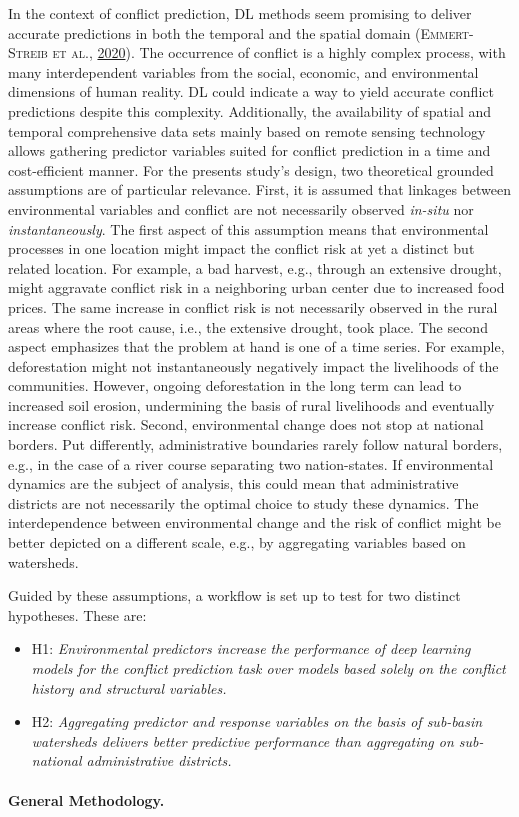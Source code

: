 \documentclass[a4paper,11pt]{article}
\begin{document}
In the context of conflict prediction, DL methods seem promising to deliver
accurate predictions in both the temporal and the spatial domain \textsc{(\textnormal{\textsc{Emmert-Streib} \textsc{et al.}}, \textnormal{\protect\hyperlink{ref-emmert2020}{2020}})}.
The occurrence of conflict is a highly complex process, with many interdependent variables
from the social, economic, and environmental dimensions of human reality. DL could
indicate a way to yield accurate conflict predictions despite this complexity.
Additionally, the availability of spatial and temporal comprehensive data sets
mainly based on remote sensing technology allows gathering predictor variables suited for
conflict prediction in a time and cost-efficient manner. For the presents study's
design, two theoretical grounded assumptions are of particular relevance. First,
it is assumed that linkages between environmental variables and conflict are not
necessarily observed \emph{in-situ} nor \emph{instantaneously}. The first aspect of this
assumption means that environmental processes in one location might impact the
conflict risk at yet a distinct but related location. For example, a bad harvest,
e.g., through an extensive drought, might aggravate conflict risk in a neighboring
urban center due to increased food prices. The same increase in conflict risk is
not necessarily observed in the rural areas where the root cause, i.e., the
extensive drought, took place. The second aspect emphasizes that the problem at
hand is one of a time series. For example, deforestation might not instantaneously
negatively impact the livelihoods of the communities. However, ongoing deforestation
in the long term can lead to increased soil erosion, undermining the basis of rural
livelihoods and eventually increase conflict risk. Second, environmental change
does not stop at national borders. Put differently, administrative boundaries
rarely follow natural borders, e.g., in the case of a river course separating
two nation-states. If environmental dynamics are the subject of analysis, this
could mean that administrative districts are not necessarily the optimal choice
to study these dynamics. The interdependence between environmental change and
the risk of conflict might be better depicted on a different scale, e.g., by
aggregating variables based on watersheds.

Guided by these assumptions, a workflow is set up to test for two distinct hypotheses.
These are:
\begin{itemize}
\item
  H1: \emph{Environmental predictors increase the performance of deep learning models
  for the conflict prediction task over models based solely on the conflict history and structural variables.}
\item
  H2: \emph{Aggregating predictor and response variables on the basis of sub-basin
  watersheds delivers better predictive performance than aggregating on sub-national
  administrative districts.}
\end{itemize}
\hypertarget{general-methodology.}{%
\paragraph{General Methodology.}\label{general-methodology.}}
\end{document}

